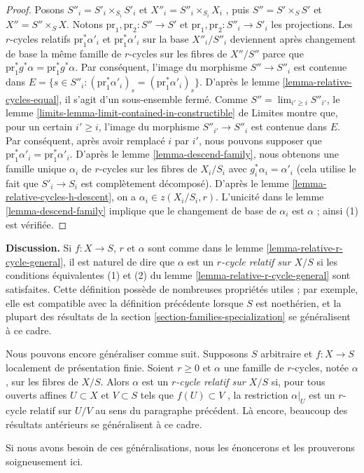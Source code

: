 \begin{proof}
\medskip\noindent
 Posons $S''_i = S'_i \times_{S_i} S'_i$ et $X''_i = S''_i \times_{S_i} X_i$
 , puis $S'' = S' \times_S S'$ et $X'' = S'' \times_S X$.
 Notons $\text{pr}_1, \text{pr}_2 : S'' \to S'$ et 
$\text{pr}_1, \text{pr}_2 : S''_i \to S'_i$ les projections.
 Les $r$-cycles relatifs  $\text{pr}_1^*\alpha'_i$  et  $\text{pr}_1^*\alpha'_i$
  sur la base  $X''_i/S''_i$ deviennent après changement de base la même famille de $r$-cycles 
sur les fibres de $X''/S''$  parce que  
$\text{pr}_1^*g^*\alpha = \text{pr}_1^*g^*\alpha$. 
Par conséquent, l'image du morphisme $S'' \to S''_i$ est contenue dans $E =
\{s \in S''_i : (\text{pr}_1^*\alpha'_i)_s = (\text{pr}_1^*\alpha'_i)_s\}$. 
D'après le lemme \ref{lemma-relative-cycles-equal}, il s'agit d'un sous-ensemble fermé.
 Comme $S'' = \lim_{i' \geq i} S''_{i'}$, le 
lemme 
\ref{limits-lemma-limit-contained-in-constructible} de Limites montre 
que, pour un certain $i' \geq i$, l'image du morphisme $S''_{i'} \to S''_i$
 est contenue dans $E$. Par conséquent, après avoir remplacé  $i$  par  $i'$, nous pouvons supposer que 
$\text{pr}_1^*\alpha'_i = \text{pr}_1^*\alpha'_i$. 
D'après le lemme \ref{lemma-descend-family}, nous
 obtenons une famille unique  $\alpha_i$
  de  $r$-cycles sur les fibres de  $X_i/S_i$
 avec  $g_i^*\alpha_i = \alpha'_i$  (cela utilise le fait que  $S'_i \to S_i$
  est complètement décomposé). D'après
 le lemme \ref{lemma-relative-cycles-h-descent},
 on a $\alpha_i \in z(X_i/S_i, r)$.
 L'unicité dans le lemme \ref{lemma-descend-family} implique que le 
changement de base de $\alpha_i$ est $\alpha$ ; ainsi (1) est vérifiée. 
\end{proof} 

\noindent
 {\bf Discussion.} 
Si $f : X \to S$, $r$ et $\alpha$ sont comme dans
 le lemme \ref{lemma-relative-r-cycle-general}, il est naturel de 
dire que $\alpha$ est un {\it $r$-cycle relatif sur $X/S$} si
 les conditions équivalentes
 (1) et (2) du lemme \ref{lemma-relative-r-cycle-general} sont satisfaites.
 Cette définition possède de nombreuses propriétés utiles ; par 
exemple, elle est compatible avec la définition précédente lorsque $S$
 est noethérien, et la plupart des résultats de 
la section \ref{section-families-specialization} se généralisent
 à ce cadre. 

\medskip\noindent
 Nous pouvons encore généraliser comme suit. 
Supposons $S$ arbitraire et $f : X \to S$ localement de présentation finie. 
Soient $r \geq 0$ et $\alpha$ une famille de $r$-cycles, notée $\alpha$, sur les fibres de 
$X/S$. Alors $\alpha$ est un {\it $r$-cycle relatif sur $X/S$} si, pour tous 
ouverts affines $U \subset X$ et $V \subset S$ tels que $f(U) \subset V$
 , la restriction $\alpha|_U$ est un $r$-cycle relatif sur $U/V$ au
 sens du paragraphe précédent. Là encore, beaucoup des résultats antérieurs
 se généralisent à ce cadre. 

\medskip\noindent
 Si nous avons besoin de ces généralisations, nous les énoncerons et les prouverons 
soigneusement ici. 



















 

 
 

 
